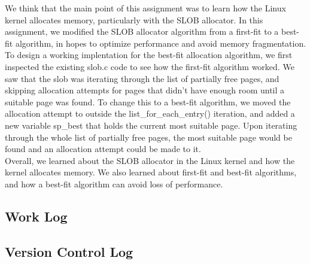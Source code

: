 \documentclass[journal, letterpaper, draftclsnofoot, onecolumn, 10pt]{IEEEtran}
\begin{document}
We think that the main point of this assignment was to learn how the Linux kernel allocates memory, particularly with the SLOB allocator.
In this assignment, we modified the SLOB allocator algorithm from a first-fit to a best-fit algorithm, in hopes to optimize performance and avoid memory fragmentation. \\
To design a working implentation for the best-fit allocation algorithm, we first inspected the existing slob.c code to see how the first-fit algorithm worked.
We saw that the slob was iterating through the list of partially free pages, and skipping allocation attempts for pages that didn't have enough room until a suitable page was found.
To change this to a best-fit algorithm, we moved the allocation attempt to outside the list_for_each_entry() iteration, and added a new variable sp_best that holds the current most suitable page.
Upon iterating through the whole list of partially free pages, the most suitable page would be found and an allocation attempt could be made to it. \\






Overall, we learned about the SLOB allocator in the Linux kernel and how the kernel allocates memory.
We also learned about first-fit and best-fit algorithms, and how a best-fit algorithm can avoid loss of performance. \\


\subsection{Work Log}



\clearpage
\subsection{Version Control Log}



\FloatBarrier



\scalebox{0.8}{
}


\FloatBarrier
\end{document}
